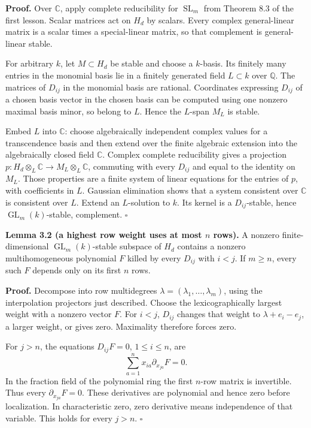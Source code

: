 \documentclass[
]{article}
\begin{document}
\textbf{Proof.} Over \(\mathbb C\), apply complete reducibility for
\(\operatorname{SL}_m\) from Theorem 8.3 of the first lesson. Scalar
matrices act on \(H_d\) by scalars. Every complex general-linear matrix
is a scalar times a special-linear matrix, so that complement is
general-linear stable.

For arbitrary \(k\), let \(M\subset H_d\) be stable and choose a
\(k\)-basis. Its finitely many entries in the monomial basis lie in a
finitely generated field \(L\subset k\) over \(\mathbb Q\). The matrices
of \(D_{ij}\) in the monomial basis are rational. Coordinates expressing
\(D_{ij}\) of a chosen basis vector in the chosen basis can be computed
using one nonzero maximal basis minor, so belong to \(L\). Hence the
\(L\)-span \(M_L\) is stable.

Embed \(L\) into \(\mathbb C\): choose algebraically independent complex
values for a transcendence basis and then extend over the finite
algebraic extension into the algebraically closed field \(\mathbb C\).
Complex complete reducibility gives a projection
\(p:H_d\otimes_L\mathbb C\to M_L\otimes_L\mathbb C\), commuting with
every \(D_{ij}\) and equal to the identity on \(M_L\). Those properties
are a finite system of linear equations for the entries of \(p\), with
coefficients in \(L\). Gaussian elimination shows that a system
consistent over \(\mathbb C\) is consistent over \(L\). Extend an
\(L\)-solution to \(k\). Its kernel is a \(D_{ij}\)-stable, hence
\(\operatorname{GL}_m(k)\)-stable, complement. \(\square\)

\protect{}\label{lemma-3-2}{}

\textbf{Lemma 3.2 (a highest row weight uses at most \(n\) rows).} A
nonzero finite-dimensional \(\operatorname{GL}_m(k)\)-stable subspace of
\(H_d\) contains a nonzero multihomogeneous polynomial \(F\) killed by
every \(D_{ij}\) with \(i<j\). If \(m\geq n\), every such \(F\) depends
only on its first \(n\) rows.

\textbf{Proof.} Decompose into row multidegrees
\(\lambda=(\lambda_1,\ldots,\lambda_m)\), using the interpolation
projectors just described. Choose the lexicographically largest weight
with a nonzero vector \(F\). For \(i<j\), \(D_{ij}\) changes that weight
to \(\lambda+e_i-e_j\), a larger weight, or gives zero. Maximality
therefore forces zero.

For \(j>n\), the equations \(D_{ij}F=0\), \(1\leq i\leq n\), are \[
\sum_{a=1}^n x_{ia}\partial_{x_{ja}}F=0.
\] In the fraction field of the polynomial ring the first \(n\)-row
matrix is invertible. Thus every \(\partial_{x_{ja}}F=0\). These
derivatives are polynomial and hence zero before localization. In
characteristic zero, zero derivative means independence of that
variable. This holds for every \(j>n\). \(\square\)
\end{document}
